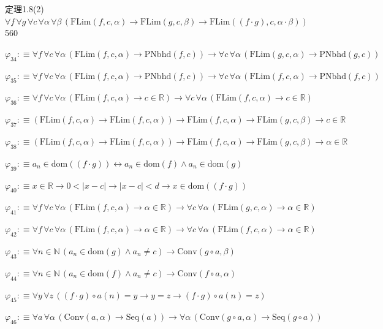 \begin{fullproof}{定理1.8(2)}{$\forall f\,\forall g\,\forall c\,\forall \alpha\,\forall \beta\,(\mathrm{FLim}(f,c,\alpha) \to \mathrm{FLim}(g,c,\beta) \to \mathrm{FLim}((f \cdot g),c,\alpha \cdot \beta))$}{560}
\begin{abbrevlist}
\item $\varphi_{34} :\equiv \forall f\,\forall c\,\forall \alpha\,(\mathrm{FLim}(f,c,\alpha) \to \mathrm{PNbhd}(f,c)) \to \forall c\,\forall \alpha\,(\mathrm{FLim}(g,c,\alpha) \to \mathrm{PNbhd}(g,c))$
\item $\varphi_{35} :\equiv \forall f\,\forall c\,\forall \alpha\,(\mathrm{FLim}(f,c,\alpha) \to \mathrm{PNbhd}(f,c)) \to \forall c\,\forall \alpha\,(\mathrm{FLim}(f,c,\alpha) \to \mathrm{PNbhd}(f,c))$
\item $\varphi_{36} :\equiv \forall f\,\forall c\,\forall \alpha\,(\mathrm{FLim}(f,c,\alpha) \to c \in \mathbb{R}) \to \forall c\,\forall \alpha\,(\mathrm{FLim}(f,c,\alpha) \to c \in \mathbb{R})$
\item $\varphi_{37} :\equiv (\mathrm{FLim}(f,c,\alpha) \to \mathrm{FLim}(f,c,\alpha)) \to \mathrm{FLim}(f,c,\alpha) \to \mathrm{FLim}(g,c,\beta) \to c \in \mathbb{R}$
\item $\varphi_{38} :\equiv (\mathrm{FLim}(f,c,\alpha) \to \mathrm{FLim}(f,c,\alpha)) \to \mathrm{FLim}(f,c,\alpha) \to \mathrm{FLim}(g,c,\beta) \to \alpha \in \mathbb{R}$
\item $\varphi_{39} :\equiv a_{n} \in \mathrm{dom}((f \cdot g)) \leftrightarrow a_{n} \in \mathrm{dom}(f) \land a_{n} \in \mathrm{dom}(g)$
\item $\varphi_{40} :\equiv x \in \mathbb{R} \to 0 < \lvert x - c \rvert \to \lvert x - c \rvert < d \to x \in \mathrm{dom}((f \cdot g))$
\item $\varphi_{41} :\equiv \forall f\,\forall c\,\forall \alpha\,(\mathrm{FLim}(f,c,\alpha) \to \alpha \in \mathbb{R}) \to \forall c\,\forall \alpha\,(\mathrm{FLim}(g,c,\alpha) \to \alpha \in \mathbb{R})$
\item $\varphi_{42} :\equiv \forall f\,\forall c\,\forall \alpha\,(\mathrm{FLim}(f,c,\alpha) \to \alpha \in \mathbb{R}) \to \forall c\,\forall \alpha\,(\mathrm{FLim}(f,c,\alpha) \to \alpha \in \mathbb{R})$
\item $\varphi_{43} :\equiv \forall n \in \mathbb{N}\,(a_{n} \in \mathrm{dom}(g) \land a_{n} \neq c) \to \mathrm{Conv}(g \circ a,\beta)$
\item $\varphi_{44} :\equiv \forall n \in \mathbb{N}\,(a_{n} \in \mathrm{dom}(f) \land a_{n} \neq c) \to \mathrm{Conv}(f \circ a,\alpha)$
\item $\varphi_{45} :\equiv \forall y\,\forall z\,((f \cdot g) \circ a(n) = y \to y = z \to (f \cdot g) \circ a(n) = z)$
\item $\varphi_{46} :\equiv \forall a\,\forall \alpha\,(\mathrm{Conv}(a,\alpha) \to \mathrm{Seq}(a)) \to \forall \alpha\,(\mathrm{Conv}(g \circ a,\alpha) \to \mathrm{Seq}(g \circ a))$

\end{abbrevlist}
\end{fullproof}
